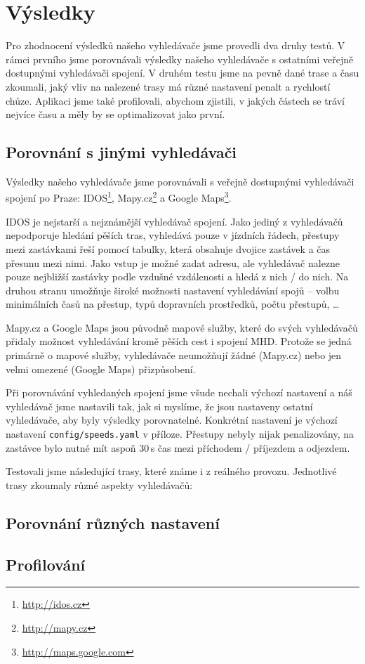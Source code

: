\chapter{Výsledky}
Pro zhodnocení výsledků našeho vyhledávače jsme provedli dva druhy testů. V
rámci prvního jsme porovnávali výsledky našeho vyhledávače s ostatními veřejně
dostupnými vyhledávači spojení. V druhém testu jsme na pevně dané trase a času
zkoumali, jaký vliv na nalezené trasy má různé nastavení penalt a rychlostí
chůze. Aplikaci jsme také profilovali, abychom zjistili, v jakých částech se
tráví nejvíce času a měly by se optimalizovat jako první.

\section{Porovnání s jinými vyhledávači}
Výsledky našeho vyhledávače jsme porovnávali s veřejně dostupnými vyhledávači
spojení po Praze: IDOS\footnote{\url{http://idos.cz}},
Mapy.cz\footnote{\url{http://mapy.cz}} a Google
Maps\footnote{\url{http://maps.google.com}}. 

IDOS je nejstarší a nejznámější vyhledávač spojení. Jako jediný z vyhledávačů
nepodporuje hledání pěších tras, vyhledává pouze v jízdních řádech, přestupy
mezi zastávkami řeší pomocí tabulky, která obsahuje dvojice zastávek a čas
přesunu mezi nimi. Jako vstup je možné zadat adresu, ale vyhledávač nalezne
pouze nejbližší zastávky podle vzdušné vzdálenosti a hledá z nich / do nich. 
Na druhou stranu umožňuje široké možnosti nastavení vyhledávání spojů -- volbu
minimálních časů na přestup, typů dopravních prostředků, počtu přestupů, \dots

Mapy.cz a Google Maps jsou původně mapové služby, které do svých vyhledávačů
přidaly možnost vyhledávání kromě pěších cest i spojení MHD. Protože se jedná
primárně o mapové služby, vyhledávače neumožňují žádné (Mapy.cz) nebo jen velmi
omezené (Google Maps) přizpůsobení. 

Při porovnávání vyhledaných spojení jsme všude nechali výchozí nastavení a náš
vyhledávač jsme nastavili tak, jak si myslíme, že jsou nastaveny ostatní
vyhledávače, aby byly výsledky porovnatelné. Konkrétní nastavení je výchozí
nastavení {\tt config/speeds.yaml} v příloze. Přestupy nebyly nijak
penalizovány, na zastávce bylo nutné mít aspoň 30\,s čas mezi příchodem /
příjezdem a odjezdem.

Testovali jsme následující trasy, které známe i z reálného provozu. Jednotlivé
trasy zkoumaly různé aspekty vyhledávačů:
\begin{itemize}

\end{itemize}
\section{Porovnání různých nastavení}
\section{Profilování}
